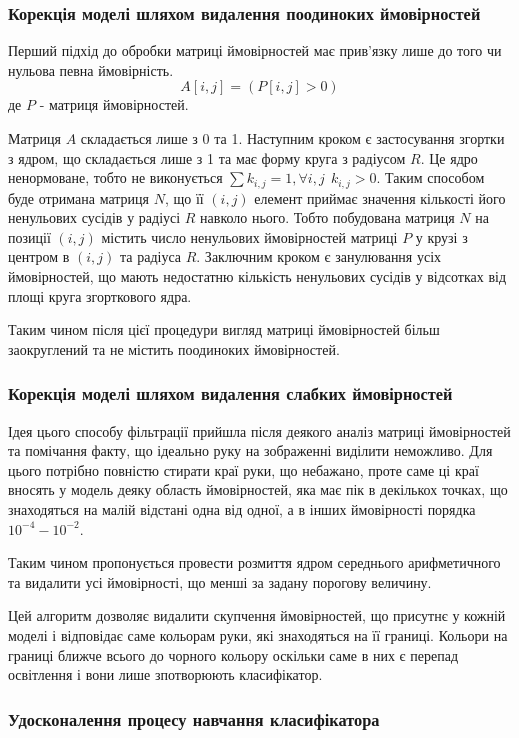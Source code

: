 \subsubsection{Корекція моделі шляхом видалення поодиноких ймовірностей}
Перший підхід до обробки матриці ймовірностей має прив'язку лише до того чи нульова певна ймовірність.
\begin{equation}
	A[i,j] = ( P[i,j] > 0 )
\end{equation}
де $P$ - матриця ймовірностей.

Матриця $A$ складається лише з 0 та 1. Наступним кроком є застосування згортки з ядром, що складається лише з 1 та має форму круга з радіусом $R$. Це ядро ненормоване, тобто не виконується $\sum{k_{i,j}} = 1, \forall i,j \:\: k_{i,j} > 0$. Таким способом буде отримана матриця $N$, що її $(i,j)$ елемент приймає значення кількості його ненульових сусідів у радіусі $R$ навколо нього. Тобто побудована матриця $N$ на позиції $(i,j)$ містить число ненульових ймовірностей матриці $P$ у крузі з центром в $(i,j)$ та радіуса $R$. Заключним кроком є занулювання усіх ймовірностей, що мають недостатню кількість ненульових сусідів у відсотках від площі круга згорткового ядра.

Таким чином після цієї процедури вигляд матриці ймовірностей більш заокруглений та не містить поодиноких ймовірностей.

\subsubsection{Корекція моделі шляхом видалення слабких ймовірностей}
Ідея цього способу фільтрації прийшла після деякого аналіз матриці ймовірностей та помічання факту, що ідеально руку на зображенні виділити неможливо. Для цього потрібно повністю стирати краї руки, що небажано, проте саме ці краї вносять у модель деяку область ймовірностей, яка має пік в декількох точках, що знаходяться на малій відстані одна від одної, а в інших ймовірності порядка $10^{-4} - 10^{-2}$.

Таким чином пропонується провести розмиття ядром середнього арифметичного та видалити усі ймовірності, що менші за задану порогову величину.

Цей алгоритм дозволяє видалити скупчення ймовірностей, що присутнє у кожній моделі і 
відповідає саме кольорам руки, які знаходяться на її границі. Кольори на границі ближче всього до чорного кольору оскільки саме в них є перепад освітлення і вони лише зпотворюють класифікатор.

\subsubsection{Удосконалення процесу навчання класифікатора}

